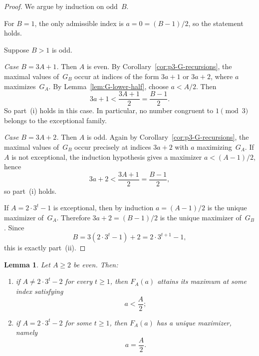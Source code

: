 \documentclass[10pt]{amsart}
\newtheorem{lemma}[theorem]{Lemma}
\theoremstyle{definition}
\theoremstyle{remark}
\begin{document}
\begin{proof}
We argue by induction on odd~$B$.

For $B=1$, the only admissible index is $a=0=(B-1)/2$, so the statement
holds.

Suppose $B>1$ is odd.

\smallskip
\emph{Case $B=3A+1$.}  Then $A$ is even.  By
Corollary~\ref{cor:p3-G-recursions}, the maximal values of~$G_B$ occur at
indices of the form $3a+1$ or $3a+2$, where $a$ maximizes~$G_A$.
By Lemma~\ref{lem:G-lower-half}, choose $a < A/2$.
Then
\[
3a+1 < \frac{3A+1}{2} = \frac{B-1}{2}.
\]
So part~(i) holds in this case.  In particular, no number congruent to
$1 \pmod{3}$ belongs to the exceptional family.

\smallskip
\emph{Case $B=3A+2$.}  Then $A$ is odd.  Again by
Corollary~\ref{cor:p3-G-recursions}, the maximal values of~$G_B$ occur
precisely at indices $3a+2$ with $a$ maximizing~$G_A$.
If $A$ is not exceptional, the induction hypothesis gives a maximizer
$a < (A-1)/2$, hence
\[
3a+2 < \frac{3A+1}{2} = \frac{B-1}{2},
\]
so part~(i) holds.

If $A = 2\cdot 3^t - 1$ is exceptional, then by induction
$a=(A-1)/2$ is the unique maximizer of~$G_A$.  Therefore
$3a+2 = (B-1)/2$ is the unique maximizer of~$G_B$.
Since
\[
B = 3(2\cdot 3^t - 1)+2 = 2\cdot 3^{t+1}-1,
\]
this is exactly part~(ii).
\end{proof}

\begin{lemma}\label{lem:F-even-sharp}
Let $A \ge 2$ be even.  Then:
\begin{enumerate}[label=\textup{(\roman*)}]
\item if $A \ne 2\cdot 3^t - 2$ for every $t \ge 1$, then
$F_A(a)$ attains its maximum at some index satisfying
\[
a < \frac{A}{2};
\]
\item if $A = 2\cdot 3^t - 2$ for some $t \ge 1$, then
$F_A(a)$ has a unique maximizer, namely
\[
a = \frac{A}{2}.
\]
\end{enumerate}
\end{lemma}
\end{document}
